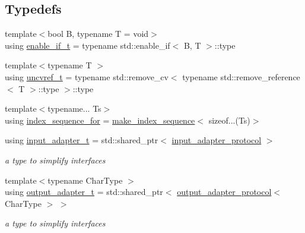 \subsection*{Typedefs}
\begin{DoxyCompactItemize}
\item 
{\footnotesize template$<$bool B, typename T  = void$>$ }\\using \hyperlink{namespacenlohmann_1_1detail_a02bcbc878bee413f25b985ada771aa9c}{enable\+\_\+if\+\_\+t} = typename std\+::enable\+\_\+if$<$ B, T $>$\+::type
\item 
{\footnotesize template$<$typename T $>$ }\\using \hyperlink{namespacenlohmann_1_1detail_a53a082eedad9f4729fcd8fed552a21f7}{uncvref\+\_\+t} = typename std\+::remove\+\_\+cv$<$ typename std\+::remove\+\_\+reference$<$ T $>$\+::type $>$\+::type
\item 
{\footnotesize template$<$typename... Ts$>$ }\\using \hyperlink{namespacenlohmann_1_1detail_a24800493c6ec02ce033dcbb47b7fd28e}{index\+\_\+sequence\+\_\+for} = \hyperlink{structnlohmann_1_1detail_1_1make__index__sequence}{make\+\_\+index\+\_\+sequence}$<$ sizeof...(Ts)$>$
\item 
using \hyperlink{namespacenlohmann_1_1detail_ae132f8cd5bb24c5e9b40ad0eafedf1c2}{input\+\_\+adapter\+\_\+t} = std\+::shared\+\_\+ptr$<$ \hyperlink{structnlohmann_1_1detail_1_1input__adapter__protocol}{input\+\_\+adapter\+\_\+protocol} $>$
\begin{DoxyCompactList}\small\item\em a type to simplify interfaces \end{DoxyCompactList}\item 
{\footnotesize template$<$typename Char\+Type $>$ }\\using \hyperlink{namespacenlohmann_1_1detail_a9b680ddfb58f27eb53a67229447fc556}{output\+\_\+adapter\+\_\+t} = std\+::shared\+\_\+ptr$<$ \hyperlink{structnlohmann_1_1detail_1_1output__adapter__protocol}{output\+\_\+adapter\+\_\+protocol}$<$ Char\+Type $>$ $>$
\begin{DoxyCompactList}\small\item\em a type to simplify interfaces \end{DoxyCompactList}\end{DoxyCompactItemize}
